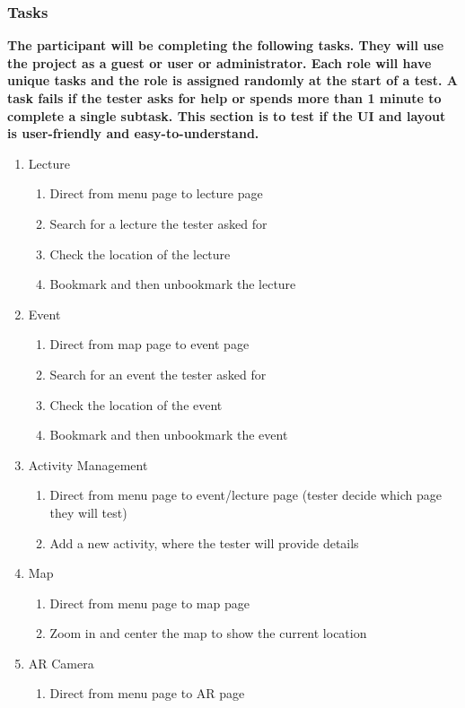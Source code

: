 \documentclass[12pt, titlepage]{article}
\begin{document}
\subsubsection{Tasks}
\textbf{The participant will be completing the following tasks. They will use the project as a guest or user or administrator. Each role will have unique tasks and the role is assigned randomly at the start of a test. A task fails if the tester asks for help or spends more than 1 minute to complete a single subtask. This section is to test if the UI and layout is user-friendly and easy-to-understand.}
\begin{enumerate}
\item Lecture
\begin{enumerate}
\item Direct from menu page to lecture page
\item Search for a lecture the tester asked for
\item Check the location of the lecture
\item Bookmark and then unbookmark the lecture
\end{enumerate}
\item Event
\begin{enumerate}
\item Direct from map page to event page
\item Search for an event the tester asked for
\item Check the location of the event
\item Bookmark and then unbookmark the event
\end{enumerate}
\item Activity Management
\begin{enumerate}
\item Direct from menu page to event/lecture page (tester decide which page they will test)
\item Add a new activity, where the tester will provide details
\end{enumerate}
\item Map
\begin{enumerate}
\item Direct from menu page to map page
\item Zoom in and center the map to show the current location
\end{enumerate}
\item AR Camera
\begin{enumerate}
\item Direct from menu page to AR page

\end{enumerate}
\end{enumerate}
\end{document}

